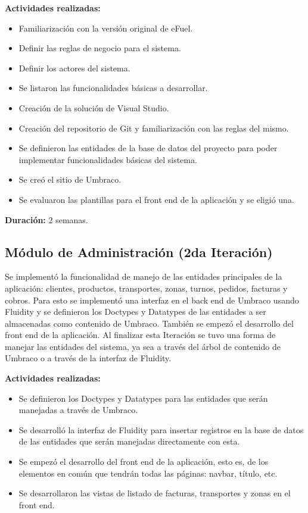 \textbf{Actividades realizadas:}
\begin{itemize}
    \item Familiarización con la versión original de eFuel.
    \item Definir las reglas de negocio para el sistema.
    \item Definir los actores del sistema.
    \item Se listaron las funcionalidades básicas a desarrollar.
    \item Creación de la solución de Visual Studio.
    \item Creación del repositorio de Git y familiarización con las reglas del mismo.
    \item Se definieron las entidades de la base de datos del proyecto para poder implementar funcionalidades básicas del sistema.
    \item Se creó el sitio de Umbraco.
    \item Se evaluaron las plantillas para el front end de la aplicación y se eligió una.
\end{itemize}

\textbf{Duración:} 2 semanas.

\subsection{Módulo de Administración (2da Iteración)}
Se implementó la funcionalidad de manejo de las entidades principales de la aplicación: clientes, productos, transportes, zonas, turnos, pedidos, facturas y cobros. Para esto se implementó una interfaz en el back end de Umbraco usando Fluidity y se definieron los Doctypes y Datatypes de las entidades a ser almacenadas como contenido de Umbraco. También se empezó el desarrollo del front end de la aplicación. Al finalizar esta Iteración se tuvo una forma de manejar las entidades del sistema, ya sea a través del árbol de contenido de Umbraco o a través de la interfaz de Fluidity.

\textbf{Actividades realizadas:}
\begin{itemize}
    \item Se definieron los Doctypes y Datatypes para las entidades que serán manejadas a través de Umbraco.
    \item Se desarrolló la interfaz de Fluidity para insertar registros en la base de datos de las entidades que serán manejadas directamente con esta.
    \item Se empezó el desarrollo del front end de la aplicación, esto es, de los elementos en común que tendrán todas las páginas: navbar, título, etc.
    \item Se desarrollaron las vistas de listado de facturas, transportes y zonas en el front end.
\end{itemize}

